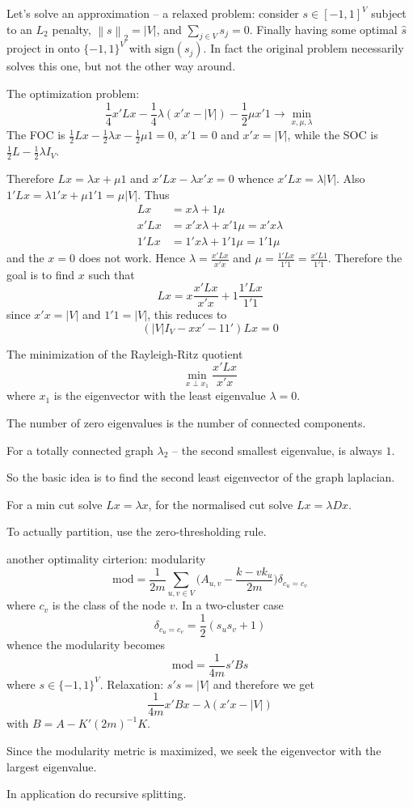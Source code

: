 \documentclass[a4paper]{article}
\newcommand{\nrm}[1]{{\left\| #1 \right \|}}
\begin{document}
Let's solve an approximation -- a relaxed problem:
consider $s\in [-1,1]^V$ subject to an $L_2$ penalty, $\nrm{s}_2 = |V|$, and $\sum_{j\in V} s_j = 0$. Finally having some optimal $\hat{s}$ project in onto $\{-1,1\}^V$ with $\text{sign}(s_j)$.
In fact the original problem necessarily solves this one, but not the other way around.

The optimization problem:
\[\frac{1}{4} x'Lx - \frac{1}{4}\lambda(x'x - |V|) - \frac{1}{2}\mu x'1 \to \min_{x,\mu,\lambda}\]
The FOC is $\frac{1}{2}Lx - \frac{1}{2} \lambda x - \frac{1}{2}\mu 1 = 0$, $x'1 = 0$ and $x'x=|V|$, while the SOC is $\frac{1}{2}L - \frac{1}{2}\lambda I_V$.

Therefore $Lx = \lambda x + \mu 1$ and $x'Lx - \lambda x'x = 0$ whence $x'Lx = \lambda |V|$. Also $1'Lx = \lambda 1'x + \mu 1'1 = \mu |V|$. Thus
\begin{align*}
	Lx &= x \lambda + 1 \mu\\
	x'Lx &= x'x \lambda + x'1 \mu = x'x \lambda\\
	1'Lx &= 1'x \lambda + 1'1 \mu = 1'1 \mu
\end{align*}
and the $x=0$ does not work. Hence $\lambda = \frac{x'Lx}{x'x}$ and $\mu = \frac{1'Lx}{1'1} = \frac{x'L1}{1'1}$. Therefore the goal is to find $x$ such that 
\[Lx = x \frac{x'Lx}{x'x} + 1 \frac{1'Lx}{1'1}\]
since $x'x = |V|$ and $1'1=|V|$, this reduces to
\[(|V|I_V - x x' - 1 1' ) Lx = 0\]


The minimization of the Rayleigh-Ritz quotient
\[\min_{x\perp x_1}\frac{x'Lx}{x'x}\]
where $x_1$ is the eigenvector with the least eigenvalue $\lambda = 0$.

The number of zero eigenvalues is the number of connected components.

For a totally connected graph $\lambda_2$ -- the second smallest eigenvalue, is always $1$.

So the basic idea is to find the second least eigenvector of the graph laplacian.

For a min cut solve $Lx = \lambda x$, for the normalised cut solve $Lx=\lambda D x$.

To actually partition, use the zero-thresholding rule.


another optimality cirterion:
modularity
\[\text{mod} = \frac{1}{2m} \sum_{u,v\in V} \Big(A_{u,v} - \frac{k-vk_u}{2m}\Big)\delta_{c_u=c_v}\]
where $c_v$ is the class of the node $v$. In a two-cluster case 
\[\delta_{c_u=c_v} = \frac{1}{2}(s_u s_v + 1)\]
whence the modularity becomes
\[\text{mod} = \frac{1}{4m}s'Bs\]
where $s\in \{-1,1\}^V$.
Relaxation: $s's = |V|$ and therefore we get
\[\frac{1}{4m} x'Bx - \lambda(x'x - |V|)\]
with $B=A - K'(2m)^{-1}K$.

Since the modularity metric is maximized, we seek the eigenvector with the largest eigenvalue.


In application do recursive splitting.


\end{document}
